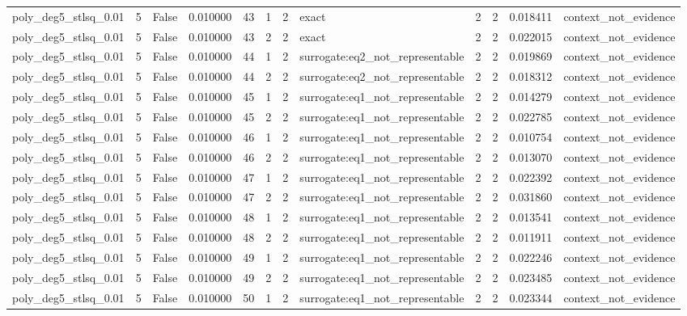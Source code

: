 \begin{tabular}{lrrrrrrlrrrl}
poly\_deg5\_stlsq\_0.01 & 5 & False & 0.010000 & 43 & 1 & 2 & exact & 2 & 2 & 0.018411 & context\_not\_evidence \\
poly\_deg5\_stlsq\_0.01 & 5 & False & 0.010000 & 43 & 2 & 2 & exact & 2 & 2 & 0.022015 & context\_not\_evidence \\
poly\_deg5\_stlsq\_0.01 & 5 & False & 0.010000 & 44 & 1 & 2 & surrogate:eq2\_not\_representable & 2 & 2 & 0.019869 & context\_not\_evidence \\
poly\_deg5\_stlsq\_0.01 & 5 & False & 0.010000 & 44 & 2 & 2 & surrogate:eq2\_not\_representable & 2 & 2 & 0.018312 & context\_not\_evidence \\
poly\_deg5\_stlsq\_0.01 & 5 & False & 0.010000 & 45 & 1 & 2 & surrogate:eq1\_not\_representable & 2 & 2 & 0.014279 & context\_not\_evidence \\
poly\_deg5\_stlsq\_0.01 & 5 & False & 0.010000 & 45 & 2 & 2 & surrogate:eq1\_not\_representable & 2 & 2 & 0.022785 & context\_not\_evidence \\
poly\_deg5\_stlsq\_0.01 & 5 & False & 0.010000 & 46 & 1 & 2 & surrogate:eq1\_not\_representable & 2 & 2 & 0.010754 & context\_not\_evidence \\
poly\_deg5\_stlsq\_0.01 & 5 & False & 0.010000 & 46 & 2 & 2 & surrogate:eq1\_not\_representable & 2 & 2 & 0.013070 & context\_not\_evidence \\
poly\_deg5\_stlsq\_0.01 & 5 & False & 0.010000 & 47 & 1 & 2 & surrogate:eq1\_not\_representable & 2 & 2 & 0.022392 & context\_not\_evidence \\
poly\_deg5\_stlsq\_0.01 & 5 & False & 0.010000 & 47 & 2 & 2 & surrogate:eq1\_not\_representable & 2 & 2 & 0.031860 & context\_not\_evidence \\
poly\_deg5\_stlsq\_0.01 & 5 & False & 0.010000 & 48 & 1 & 2 & surrogate:eq1\_not\_representable & 2 & 2 & 0.013541 & context\_not\_evidence \\
poly\_deg5\_stlsq\_0.01 & 5 & False & 0.010000 & 48 & 2 & 2 & surrogate:eq1\_not\_representable & 2 & 2 & 0.011911 & context\_not\_evidence \\
poly\_deg5\_stlsq\_0.01 & 5 & False & 0.010000 & 49 & 1 & 2 & surrogate:eq1\_not\_representable & 2 & 2 & 0.022246 & context\_not\_evidence \\
poly\_deg5\_stlsq\_0.01 & 5 & False & 0.010000 & 49 & 2 & 2 & surrogate:eq1\_not\_representable & 2 & 2 & 0.023485 & context\_not\_evidence \\
poly\_deg5\_stlsq\_0.01 & 5 & False & 0.010000 & 50 & 1 & 2 & surrogate:eq1\_not\_representable & 2 & 2 & 0.023344 & context\_not\_evidence \\

\end{tabular}
